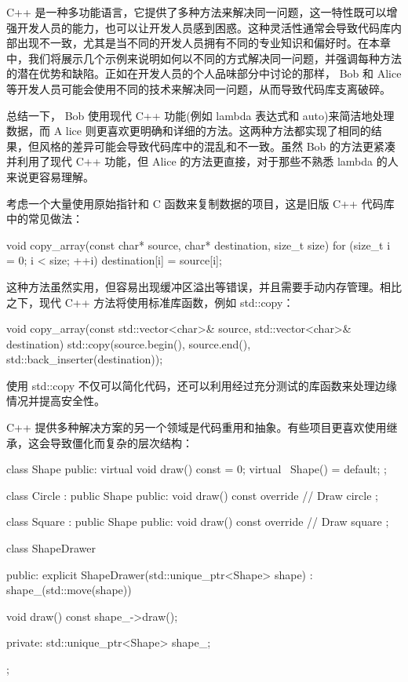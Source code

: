 
C++ 是一种多功能语言，它提供了多种方法来解决同一问题，这一特性既可以增强开发人员的能力，也可以让开发人员感到困惑。这种灵活性通常会导致代码库内部出现不一致，尤其是当不同的开发人员拥有不同的专业知识和偏好时。在本章中，我们将展示几个示例来说明如何以不同的方式解决同一问题，并强调每种方法的潜在优势和缺陷。正如在开发人员的个人品味部分中讨论的那样， Bob 和 Alice 等开发人员可能会使用不同的技术来解决同一问题，从而导致代码库支离破碎。


总结一下， Bob 使用现代 C++ 功能(例如 lambda 表达式和 auto)来简洁地处理数据，而 A lice 则更喜欢更明确和详细的方法。这两种方法都实现了相同的结果，但风格的差异可能会导致代码库中的混乱和不一致。虽然 Bob 的方法更紧凑并利用了现代 C++ 功能，但 Alice 的方法更直接，对于那些不熟悉 lambda 的人来说更容易理解。


考虑一个大量使用原始指针和 C 函数来复制数据的项目，这是旧版 C++ 代码库中的常见做法：

\begin{cpp}
void copy_array(const char* source, char* destination, size_t size) {
    for (size_t i = 0; i < size; ++i) {
        destination[i] = source[i];
    }
}
\end{cpp}

这种方法虽然实用，但容易出现缓冲区溢出等错误，并且需要手动内存管理。相比之下，现代 C++ 方法将使用标准库函数，例如 std::copy：

\begin{cpp}
void copy_array(const std::vector<char>& source, std::vector<char>&
destination) {
    std::copy(source.begin(), source.end(), std::back_inserter(destination));
}
\end{cpp}

使用 std::copy 不仅可以简化代码，还可以利用经过充分测试的库函数来处理边缘情况并提高安全性。


C++ 提供多种解决方案的另一个领域是代码重用和抽象。有些项目更喜欢使用继承，这会导致僵化而复杂的层次结构：

\begin{cpp}
class Shape {
public:
    virtual void draw() const = 0;
    virtual ~Shape() = default;
};

class Circle : public Shape {
public:
    void draw() const override {
        // Draw circle
    }
};

class Square : public Shape {
public:
    void draw() const override {
        // Draw square
    }
};

class ShapeDrawer {
public:
    explicit ShapeDrawer(std::unique_ptr<Shape> shape) : shape_(std::move(shape)) {}

    void draw() const {
        shape_->draw();
    }

private:
    std::unique_ptr<Shape> shape_;
};
\end{cpp}

